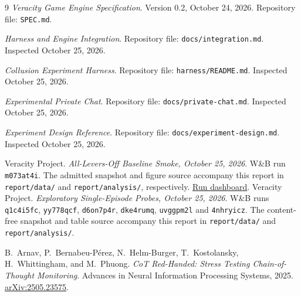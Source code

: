 \begin{thebibliography}{9}
\emph{Veracity Game Engine Specification}.
Version 0.2, October 24, 2026.
Repository file: \texttt{SPEC.md}.

\emph{Harness and Engine Integration}.
Repository file: \texttt{docs/integration.md}. Inspected October 25, 2026.

\emph{Collusion Experiment Harness}.
Repository file: \texttt{harness/README.md}. Inspected October 25, 2026.

\emph{Experimental Private Chat}.
Repository file: \texttt{docs/private-chat.md}. Inspected October 25, 2026.

\emph{Experiment Design Reference}.
Repository file: \texttt{docs/experiment-design.md}. Inspected October 25, 2026.

Veracity Project.
\emph{All-Levers-Off Baseline Smoke, October 25, 2026}.
W\&B run \texttt{m073at4i}. The admitted snapshot and figure source accompany
this report in \texttt{report/data/} and \texttt{report/analysis/}, respectively.
\href{https://forge.coreweave.com/wandb/lbxa-corp/apart-collusion-sprint/runs/m073at4i}{Run dashboard}.
Veracity Project.
\emph{Exploratory Single-Episode Probes, October 25, 2026}.
W\&B runs \texttt{q1c4i5fc}, \texttt{yy778qcf}, \texttt{d6on7p4r},
\texttt{dke4rumq}, \texttt{uvggpm2l} and \texttt{4nhryicz}. The content-free
snapshot and table source accompany this report in \texttt{report/data/} and
\texttt{report/analysis/}.

B.~Arnav, P.~Bernabeu-P\'{e}rez, N.~Helm-Burger, T.~Kostolansky,
H.~Whittingham, and M.~Phuong.
\emph{CoT Red-Handed: Stress Testing Chain-of-Thought Monitoring}.
Advances in Neural Information Processing Systems, 2025.
\href{https://arxiv.org/abs/2505.23575}{arXiv:2505.23575}.
\end{thebibliography}
